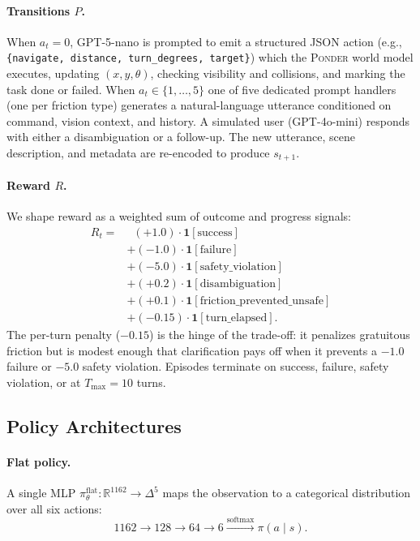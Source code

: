 \paragraph{Transitions $P$.}
When $a_t = 0$, GPT-5-nano is prompted to emit a structured JSON action (e.g., \texttt{\{navigate, distance, turn\_degrees, target\}}) which the \textsc{Ponder} world model executes, updating $(x, y, \theta)$, checking visibility and collisions, and marking the task done or failed. When $a_t \in \{1,\dots,5\}$ one of five dedicated prompt handlers (one per friction type) generates a natural-language utterance conditioned on command, vision context, and history. A simulated user (GPT-4o-mini) responds with either a disambiguation or a follow-up. The new utterance, scene description, and metadata are re-encoded to produce $s_{t+1}$.

\paragraph{Reward $R$.}
We shape reward as a weighted sum of outcome and progress signals:
\begin{equation}
\label{eq:reward}
\begin{split}
R_t = &\;\; (+1.0) \cdot \mathbf{1}[\text{success}]  \\
      &+(-1.0) \cdot \mathbf{1}[\text{failure}] \\
      &+(-5.0) \cdot \mathbf{1}[\text{safety\_violation}] \\
      &+(+0.2) \cdot \mathbf{1}[\text{disambiguation}] \\
      &+(+0.1) \cdot \mathbf{1}[\text{friction\_prevented\_unsafe}] \\
      &+(-0.15) \cdot \mathbf{1}[\text{turn\_elapsed}].
\end{split}
\end{equation}
The per-turn penalty ($-0.15$) is the hinge of the trade-off: it penalizes gratuitous friction but is modest enough that clarification pays off when it prevents a $-1.0$ failure or $-5.0$ safety violation. Episodes terminate on success, failure, safety violation, or at $T_{\max} = 10$ turns.

\subsection{Policy Architectures}

\paragraph{Flat policy.}
A single MLP $\pi_\theta^{\text{flat}} : \mathbb{R}^{1162} \to \Delta^{5}$ maps the observation to a categorical distribution over all six actions:
\[
1162 \to 128 \to 64 \to 6 \xrightarrow{\text{softmax}} \pi(a \mid s).
\]

